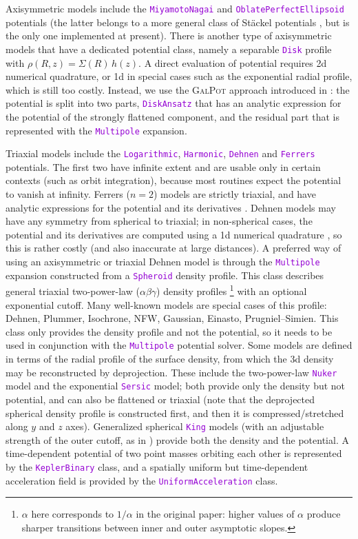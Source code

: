 \documentclass[12pt]{article}
\newcommand{\ttt}[1]{\textcolor{darkviolet}{\texttt{#1}}}
\begin{document}
Axisymmetric models include the \ttt{MiyamotoNagai} and \ttt{OblatePerfectEllipsoid} potentials (the latter belongs to a more general class of St\"ackel potentials \cite{deZeeuw1985}, but is the only one implemented at present).
There is another type of axisymmetric models that have a dedicated potential class, namely a separable \ttt{Disk} profile with $\rho(R,z) = \Sigma(R)\, h(z)$. A direct evaluation of potential requires 2d numerical quadrature, or 1d in special cases such as the exponential radial profile, which is still too costly. Instead, we use the \textsc{GalPot} approach introduced in \cite{KuijkenDubinski1995, DehnenBinney1998}: the potential is split into two parts, \ttt{DiskAnsatz} that has an analytic expression for the potential of the strongly flattened component, and the residual part that is represented with the \ttt{Multipole} expansion.

Triaxial models include the \ttt{Logarithmic}, \ttt{Harmonic}, \ttt{Dehnen} \cite{Dehnen1993} and \ttt{Ferrers} potentials. The first two have infinite extent and are usable only in certain contexts (such as orbit integration), because most routines expect the potential to vanish at infinity. Ferrers ($n=2$) models are strictly triaxial, and have analytic expressions for the potential and its derivatives \cite{Pfenniger1984}. Dehnen models may have any symmetry from spherical to triaxial; in non-spherical cases, the potential and its derivatives are computed using a 1d numerical quadrature \cite{MerrittFridman1996}, so this is rather costly (and also inaccurate at large distances). A preferred way of using an axisymmetric or triaxial Dehnen model is through the \ttt{Multipole} expansion constructed from a \ttt{Spheroid} density profile. 
This class describes general triaxial two-power-law ($\alpha\beta\gamma$) density profiles%
\footnote{$\alpha$ here corresponds to $1/\alpha$ in the original paper: higher values of $\alpha$ produce sharper transitions between inner and outer asymptotic slopes.}
\cite{Zhao1996} with an optional exponential cutoff. Many well-known models are special cases of this profile: Dehnen, Plummer, Isochrone, NFW, Gaussian, Einasto, Prugniel--Simien.
This class only provides the density profile and not the potential, so it needs to be used in conjunction with the \ttt{Multipole} potential solver. Some models are defined in terms of the radial profile of the surface density, from which the 3d density may be reconstructed by deprojection. These include the two-power-law \ttt{Nuker} model and the exponential \ttt{Sersic} model; both provide only the density but not potential, and can also be flattened or triaxial (note that the deprojected spherical density profile is constructed first, and then it is compressed/stretched along $y$ and $z$ axes). 
Generalized spherical \ttt{King} models (with an adjustable strength of the outer cutoff, as in \cite{GielesZocchi2015}) provide both the density and the potential.
A time-dependent potential of two point masses orbiting each other is represented by the \ttt{KeplerBinary} class, and a spatially uniform but time-dependent acceleration field is provided by the \ttt{UniformAcceleration} class.
\end{document}
